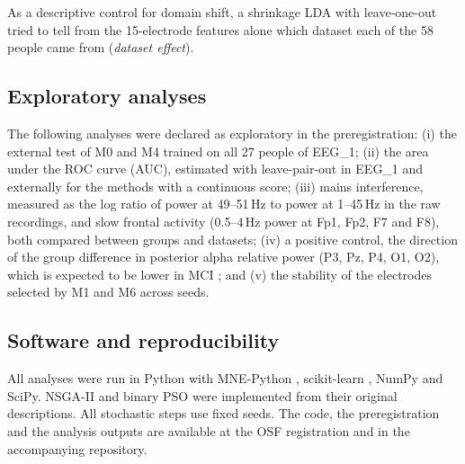 As a descriptive control for domain shift, a shrinkage LDA with leave-one-out tried to tell from the 15-electrode features alone which dataset each of the 58 people came from (\emph{dataset effect}).

\subsection{Exploratory analyses}

The following analyses were declared as exploratory in the preregistration: (i) the external test of M0 and M4 trained on all 27 people of EEG\_1; (ii) the area under the ROC curve (AUC), estimated with leave-pair-out in EEG\_1 \citep{airola2011} and externally for the methods with a continuous score; (iii) mains interference, measured as the log ratio of power at 49--51\,Hz to power at 1--45\,Hz in the raw recordings, and slow frontal activity (0.5--4\,Hz power at Fp1, Fp2, F7 and F8), both compared between groups and datasets; (iv) a positive control, the direction of the group difference in posterior alpha relative power (P3, Pz, P4, O1, O2), which is expected to be lower in MCI \citep{babiloni2015}; and (v) the stability of the electrodes selected by M1 and M6 across seeds.

\subsection{Software and reproducibility}

All analyses were run in Python with MNE-Python \citep{gramfort2013}, scikit-learn \citep{pedregosa2011}, NumPy and SciPy. NSGA-II and binary PSO were implemented from their original descriptions. All stochastic steps use fixed seeds. The code, the preregistration and the analysis outputs are available at the OSF registration and in the accompanying repository.
